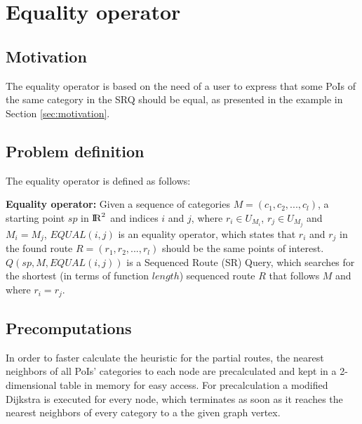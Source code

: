 



\section{Equality operator}
\label{ch:EO}

\subsection{Motivation} 
The equality operator is based on the need of a user to express that some PoIs of the same category in the SRQ should be equal, as presented in the example in Section \ref{sec:motivation}.

\subsection{Problem definition} 
\label{sec:problemEO}
The equality operator is defined as follows:

\textbf{Equality operator:} Given a sequence of categories $M = (c_1, c_2, ..., c_l)$, a starting point $sp$ in ${\rm I\!R}^2$ and indices $i$ and $j$, where $r_i \in U_{M_{i}}$, $r_j \in U_{M_{j}}$ and $M_i = M_j$, $EQUAL(i, j)$ is an equality operator, which states that $r_i$ and $r_j$ in the found route $R = (r_1, r_2, ..., r_l)$ should be the same points of interest.
$Q(sp, M, EQUAL(i, j))$ is a Sequenced Route (SR) Query, which searches for the shortest (in terms of function $length$) sequenced route $R$ that follows $M$ and where $r_i = r_j$.

\subsection{Precomputations} 
\label{sec:precompEO}
In order to faster calculate the heuristic for the partial routes, the nearest neighbors of all PoIs' categories to each node are precalculated and kept in a 2-dimensional table in memory for easy access. For precalculation a modified Dijkstra is executed for every node, which terminates as soon as it reaches the nearest neighbors of every category to a the given graph vertex.

